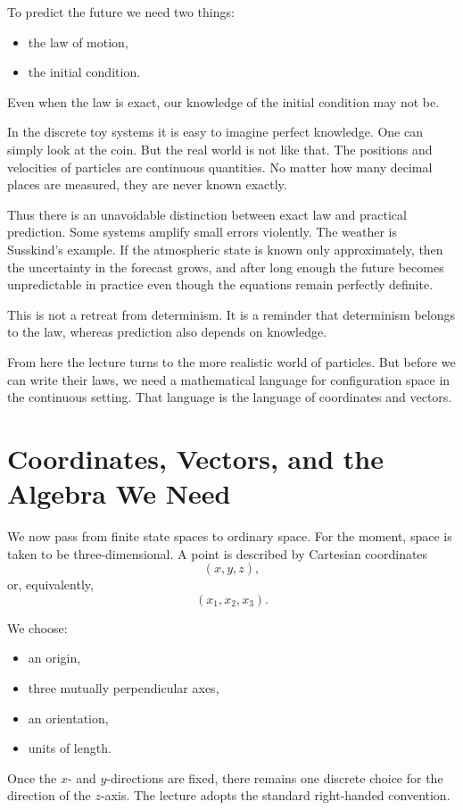 To predict the future we need two things:
\begin{itemize}
\item the law of motion,
\item the initial condition.
\end{itemize}
Even when the law is exact, our knowledge of the initial condition may not be.

In the discrete toy systems it is easy to imagine perfect knowledge. One can simply look at the coin. But the real world is not like that. The positions and velocities of particles are continuous quantities. No matter how many decimal places are measured, they are never known exactly.

Thus there is an unavoidable distinction between exact law and practical prediction. Some systems amplify small errors violently. The weather is Susskind's example. If the atmospheric state is known only approximately, then the uncertainty in the forecast grows, and after long enough the future becomes unpredictable in practice even though the equations remain perfectly definite.

This is not a retreat from determinism. It is a reminder that determinism belongs to the law, whereas prediction also depends on knowledge.

From here the lecture turns to the more realistic world of particles. But before we can write their laws, we need a mathematical language for configuration space in the continuous setting. That language is the language of coordinates and vectors.

\section{Coordinates, Vectors, and the Algebra We Need}

We now pass from finite state spaces to ordinary space. For the moment, space is taken to be three-dimensional. A point is described by Cartesian coordinates
\[
(x,y,z),
\]
or, equivalently,
\[
(x_1,x_2,x_3).
\]

We choose:
\begin{itemize}
\item an origin,
\item three mutually perpendicular axes,
\item an orientation,
\item units of length.
\end{itemize}
Once the \(x\)- and \(y\)-directions are fixed, there remains one discrete choice for the direction of the \(z\)-axis. The lecture adopts the standard right-handed convention.

